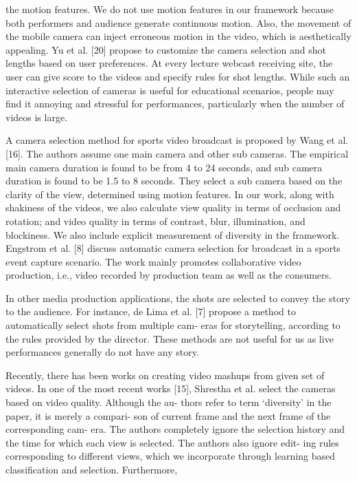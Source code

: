 \documentclass{sig-alternate-05-2015}
\begin{document}
the motion features. We do not use motion features in our framework
because both performers and audience generate continuous
motion. Also, the movement of the mobile camera can inject erroneous
motion in the video, which is aesthetically appealing. Yu et
al. [20] propose to customize the camera selection and shot lengths
based on user preferences. At every lecture webcast receiving site,
the user can give score to the videos and specify rules for shot
lengths. While such an interactive selection of cameras is useful
for educational scenarios, people may find it annoying and stressful
for performances, particularly when the number of videos is
large.\par
A camera selection method for sports video broadcast is proposed
by Wang et al. [16]. The authors assume one main camera
and other sub cameras. The empirical main camera duration is
found to be from 4 to 24 seconds, and sub camera duration is found
to be 1.5 to 8 seconds. They select a sub camera based on the clarity
of the view, determined using motion features. In our work,
along with shakiness of the videos, we also calculate view quality
in terms of occlusion and rotation; and video quality in terms
of contrast, blur, illumination, and blockiness. We also include
explicit measurement of diversity in the framework. Engstrom et
al. [8] discuss automatic camera selection for broadcast in a sports
event capture scenario. The work mainly promotes collaborative
video production, i.e., video recorded by production team as well
as the consumers.\par
In other media production applications, the shots are selected to
convey the story to the audience. For instance, de Lima et al. [7]
propose a method to automatically select shots from multiple cam-
eras for storytelling, according to the rules provided by the director.
These methods are not useful for us as live performances generally
do not have any story.\par
Recently, there has been works on creating video mashups from
given set of videos. In one of the most recent works [15], Shrestha
et al. select the cameras based on video quality. Although the au-
thors refer to term ‘diversity’ in the paper, it is merely a compari-
son of current frame and the next frame of the corresponding cam-
era. The authors completely ignore the selection history and the
time for which each view is selected. The authors also ignore edit-
ing rules corresponding to different views, which we incorporate
through learning based classification and selection. Furthermore,
\end{document}
